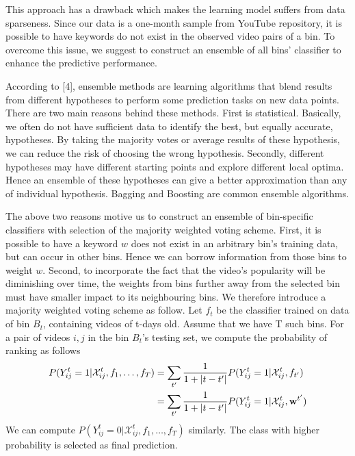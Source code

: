 This approach has a drawback which makes the learning model suffers from data sparseness. Since our data is a one-month sample from YouTube repository, it is possible to have keywords do not exist in the observed video pairs of a bin. To overcome this issue, we suggest to construct an ensemble of all bins' classifier to enhance the predictive performance. 

According to [4], ensemble methods are learning algorithms that blend results from different hypotheses to perform some prediction tasks on new data points. There are two main reasons behind these methods. First is statistical. Basically, we often do not have sufficient data to identify the best, but equally accurate, hypotheses. By taking the majority votes or average results of these hypothesis, we can reduce the risk of choosing the wrong hypothesis. Secondly, different hypotheses may have different starting points and explore different local optima. Hence an ensemble of these hypotheses can give a better approximation than any of individual hypothesis.
Bagging and Boosting are common ensemble algorithms. 

The above two reasons motive us to construct an ensemble of bin-specific classifiers with selection of the majority weighted voting scheme. First, it is possible to have a keyword $w$ does not exist in an arbitrary bin's training data, but can occur in other bins. Hence we can borrow information from those bins to weight $w$. Second, to incorporate the fact that the video's popularity will be diminishing over time, the weights from bins further away from the selected bin must have smaller impact to its neighbouring bins. We therefore introduce a majority weighted voting scheme as follow. Let $f_t$ be the classifier trained on data of bin $B_t$, containing videos of t-days old. Assume that we have T such bins. For a pair of videos $i, j$ in the bin $B_t$'s testing set, we compute the probability of ranking as follows
	\begin{align}
		P(Y_{ij}^t = 1 | \mathcal{X}_{ij}^t, f_1, \ldots, f_T) &= \sum_{t'} \frac{1}{1+|t - t'|} P(Y_{ij}^t = 1 | \mathcal{X}_{ij}^t, f_{t'}) \\ \notag 
		&= \sum_{t'} \frac{1}{1+|t - t'|} P(Y_{ij}^t = 1 | \mathcal{X}_{ij}^t, \textbf{w}^{t'})
	\end{align}
	We can compute $P(Y_{ij}^t = 0 | \mathcal{X}_{ij}^t, f_1, \ldots, f_T)$ similarly. The class with higher probability is selected as final prediction. 
	



